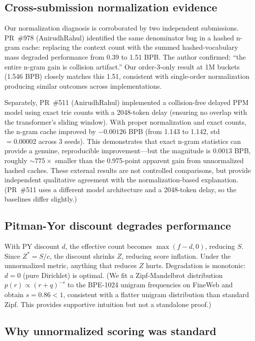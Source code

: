 \documentclass[11pt]{article}
\begin{document}
\subsection{Cross-submission normalization evidence}

Our normalization diagnosis is corroborated by two independent submissions. PR~\#978 (AnirudhRahul) identified the same denominator bug in a hashed n-gram cache: replacing the context count with the summed hashed-vocabulary mass degraded performance from 0.39 to 1.51 BPB. The author confirmed: ``the entire n-gram gain is collision artifact.'' Our order-3-only result at 1M buckets (1.546 BPB) closely matches this 1.51, consistent with single-order normalization producing similar outcomes across implementations.

Separately, PR~\#511 (AnirudhRahul) implemented a collision-free delayed PPM model using exact trie counts with a 2048-token delay (ensuring no overlap with the transformer's sliding window). With proper normalization and exact counts, the n-gram cache improved by $-0.00126$ BPB (from 1.143 to 1.142, std $= 0.00002$ across 3 seeds). This demonstrates that exact n-gram statistics can provide a genuine, reproducible improvement---but the magnitude is $0.0013$ BPB, roughly ${\sim}775\times$ smaller than the 0.975-point apparent gain from unnormalized hashed caches. These external results are not controlled comparisons, but provide independent qualitative agreement with the normalization-based explanation. (PR~\#511 uses a different model architecture and a 2048-token delay, so the baselines differ slightly.)

\subsection{Pitman-Yor discount degrades performance}

With PY discount $d$, the effective count becomes $\max(f - d, 0)$, reducing $S$. Since $Z^* = S/c$, the discount shrinks $Z$, reducing score inflation. Under the unnormalized metric, anything that reduces $Z$ hurts. Degradation is monotonic: $d = 0$ (pure Dirichlet) is optimal. (We fit a Zipf-Mandelbrot distribution $p(r) \propto (r + q)^{-s}$ to the BPE-1024 unigram frequencies on FineWeb and obtain $s = 0.86 < 1$, consistent with a flatter unigram distribution than standard Zipf. This provides supportive intuition but not a standalone proof.)

\subsection{Why unnormalized scoring was standard}
\end{document}
